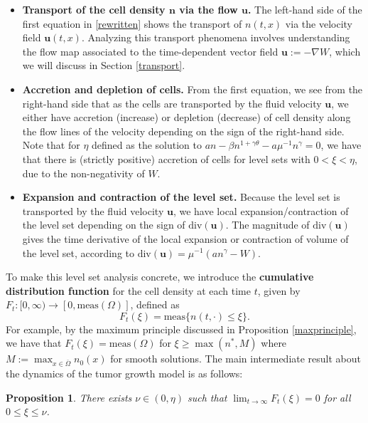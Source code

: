 \documentclass[12pt]{article}
\newcommand{\bd}{\boldsymbol}
\theoremstyle{plain}
\newtheorem{proposition}{Proposition}[section]
\begin{document}
\begin{itemize}
\item \textbf{Transport of the cell density $\bd{n}$ via the flow $\bd{u}$.} The left-hand side of the first equation in \eqref{rewritten} shows the transport of $n(t, x)$ via the velocity field $\bd{u}(t, x)$. Analyzing this transport phenomena involves understanding the flow map associated to the time-dependent vector field $\bd{u} := -\nabla W$, which we will discuss in Section \ref{transport}.
\item \textbf{Accretion and depletion of cells.} From the first equation, we see from the right-hand side that as the cells are transported by the fluid velocity $\bd{u}$, we either have accretion (increase) or depletion (decrease) of cell density along the flow lines of the velocity depending on the sign of the right-hand side. Note that for $\eta$ defined as the solution to $an - \beta n^{1 + \gamma \theta} - a\mu^{-1} n^{\gamma} = 0$, we have that there is  (strictly positive) accretion of cells for level sets with $0 < \xi < \eta$, due to the non-negativity of $W$. 
\item \textbf{Expansion and contraction of the level set.} Because the level set is transported by the fluid velocity $\bd{u}$, we have local expansion/contraction of the level set depending on the sign of $\text{div}(\bd{u})$. The magnitude of $\text{div}(\bd{u})$ gives the time derivative of the local expansion or contraction of volume of the level set, according to $\text{div}(\bd{u}) = \mu^{-1}(an^{\gamma} - W)$. 
\end{itemize}

To make this level set analysis concrete, we introduce the \textbf{cumulative distribution function} for the cell density at each time $t$, given by $F_{t}: [0, \infty) \to [0, \text{meas}(\Omega)]$, defined as
\begin{equation}\label{cdf}
F_{t}(\xi) = \text{meas}\{n(t, \cdot) \le \xi\}.
\end{equation}
For example, by the maximum principle discussed in Proposition \ref{maxprinciple}, we have that $F_{t}(\xi) = \text{meas}(\Omega)$ for $\xi \ge \max(n^{*}, M)$ where $\displaystyle M := \max_{x \in \overline{\Omega}} n_{0}(x)$ for smooth solutions. The main intermediate result about the dynamics of the tumor growth model is as follows:

\begin{proposition}\label{vanishingcdf}
There exists $\nu \in (0, \eta)$ such that $\lim_{t \to \infty} F_{t}(\xi) = 0$ for all $0 \le \xi \le \nu$. 
\end{proposition}
\end{document}

